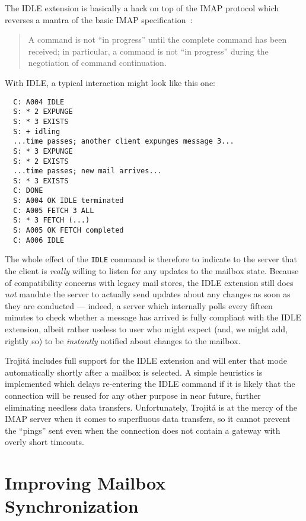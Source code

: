 \documentclass[trojita]{subfiles}
\begin{document}
The IDLE extension is basically a hack on top of the IMAP protocol which reverses a mantra of the basic IMAP
specification~\cite[p. 72]{rfc3501}:

\begin{quote}
  A command is not ``in progress'' until the complete command has been received; in particular, a command is not ``in
  progress'' during the negotiation of command continuation.
\end{quote}

With IDLE, a typical interaction might look like this one:

\begin{verbatim}
  C: A004 IDLE
  S: * 2 EXPUNGE
  S: * 3 EXISTS
  S: + idling
  ...time passes; another client expunges message 3...
  S: * 3 EXPUNGE
  S: * 2 EXISTS
  ...time passes; new mail arrives...
  S: * 3 EXISTS
  C: DONE
  S: A004 OK IDLE terminated
  C: A005 FETCH 3 ALL
  S: * 3 FETCH (...)
  S: A005 OK FETCH completed
  C: A006 IDLE
\end{verbatim}

The whole effect of the {\tt IDLE} command is therefore to indicate to the server that the client is {\em really}
willing to listen for any updates to the mailbox state.  Because of compatibility concerns with legacy mail stores, the
IDLE extension still does {\em not} mandate the server to actually send updates about any changes as soon as they are
conducted --- indeed, a server which internally polls every fifteen minutes to check whether a message has arrived is
fully compliant with the IDLE extension, albeit rather useless to user who might expect (and, we might add, rightly so)
to be {\em instantly} notified about changes to the mailbox.

Trojitá includes full support for the IDLE extension and will enter that mode automatically shortly after a mailbox is
selected.  A simple heuristics is implemented which delays re-entering the IDLE command if it is likely that the
connection will be reused for any other purpose in near future, further eliminating needless data transfers.
Unfortunately, Trojitá is at the mercy of the IMAP server when it comes to superfluous data transfers, so it cannot
prevent the ``pings'' sent even when the connection does not contain a gateway with overly short timeouts.

\section{Improving Mailbox Synchronization}
\end{document}
